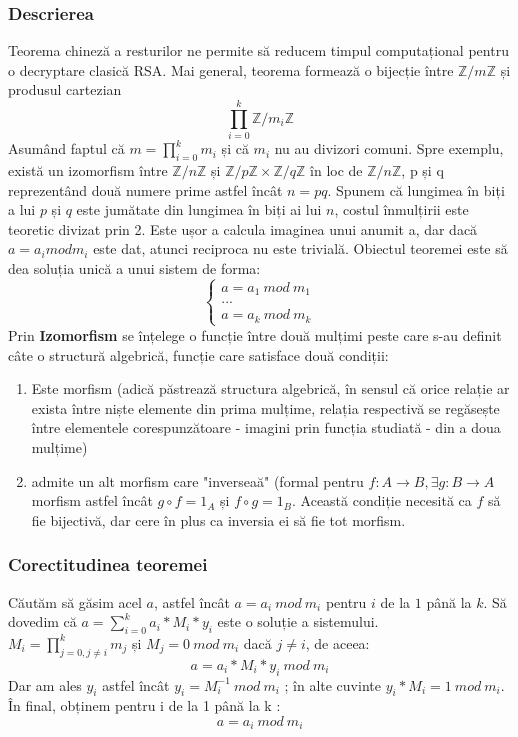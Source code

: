 \documentclass[12]{report}
\begin{document}
      \subsubsection{Descrierea}
      Teorema chineză a resturilor ne permite să reducem timpul computațional pentru o decryptare clasică RSA. Mai general, teorema formează o bijecție între $ \mathbb{Z}/m\mathbb{Z} $ și produsul cartezian \\
      $$ \prod_{i=0}^{k} \mathbb{Z}/m_i\mathbb{Z} $$
      Asumând faptul că $ m = \prod_{i=0}^{k} m_i $ și că $ m_i $ nu au divizori comuni. Spre exemplu, există un izomorfism între $ \mathbb{Z}/n\mathbb{Z}$ și $\mathbb{Z}/p\mathbb{Z} \times \mathbb{Z}/q\mathbb{Z}  $ în loc de $ \mathbb{Z}/n\mathbb{Z} $, p și q reprezentând două numere prime astfel încât $ n=pq$. Spunem că lungimea în biți a lui $p$ și $q$ este jumătate din lungimea în biți ai lui $n$, costul înmulțirii este teoretic divizat prin 2. Este ușor a calcula imaginea unui anumit a, dar dacă $ a= a_i mod m_i$ este dat, atunci reciproca nu este trivială. Obiectul teoremei este să dea soluția unică a unui sistem de forma: \\
    \[
\left\{ 
\begin{array}{c}
a=a_1 \ mod \ m_1 \\ 
... \\ 
a=a_k \ mod \ m_k
\end{array}
\right. 
\]
Prin \textbf{Izomorfism} se înțelege o funcție între două mulțimi peste care s-au definit câte o structură algebrică, funcție care satisface două condiții: \\
\begin{enumerate}
\item Este morfism (adică păstrează structura algebrică, în sensul că orice relație ar exista între niște elemente din prima mulțime, relația respectivă se regăsește între elementele corespunzătoare - imagini prin funcția studiată - din a doua mulțime)

\item admite un alt morfism care "inverseaă" (formal pentru $f:A \longrightarrow B, \exists g:B\longrightarrow A$ morfism astfel încât $g \circ f = 1_A$ și $f \circ g =1_B$. Această condiție necesită ca $f$ să fie bijectivă, dar cere în plus ca inversia ei să fie tot morfism.
\end{enumerate} 
	 \subsubsection{Corectitudinea teoremei}
	 Căutăm să găsim acel $a$, astfel încât $ a = a_i \ mod \ m_i $ pentru $i$ de la $1$ până la $k$. Să dovedim că $ a = \sum_{i=0}^{k} a_i * M_i * y_i $ este o soluție a sistemului. \\
	 $M_i= \prod_{j=0,j \neq i}^{k} m_j $ și $M_j=0 \ mod \ m_i $ dacă $j \neq i$, de aceea: 
	 $$ a = a_i * M_i * y_i \ mod \ m_i $$
	 Dar am ales $y_i$ astfel încât $y_i = M_{i}^{-1} \ mod \ m_i$ ; în alte cuvinte $y_i * M_i = 1 \ mod \ m_i$. În final, obținem pentru i de la 1 până la k :
	 $$ a = a_i \  mod \ m_i$$
	 
\end{document}

